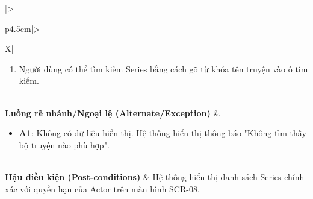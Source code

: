 \begin{table}[H]
\begin{tabularx}{\textwidth}{|>{\raggedright\arraybackslash\bfseries}p{4.5cm}|>{\raggedright\arraybackslash}X|}
\begin{minipage}[t]{\linewidth}
\begin{enumerate}[leftmargin=*]
        \item Người dùng có thể tìm kiếm Series bằng cách gõ từ khóa tên truyện vào ô tìm kiếm.
    \end{enumerate}
\end{minipage} \\ \hline
\textbf{Luồng rẽ nhánh/Ngoại lệ (Alternate/Exception)} & 
\begin{minipage}[t]{\linewidth}
    \begin{itemize}[leftmargin=*]
        \item \textbf{A1}: Không có dữ liệu hiển thị. Hệ thống hiển thị thông báo "Không tìm thấy bộ truyện nào phù hợp".
    \end{itemize}
\end{minipage} \\ \hline
\textbf{Hậu điều kiện (Post-conditions)} & Hệ thống hiển thị danh sách Series chính xác với quyền hạn của Actor trên màn hình SCR-08. \\ \hline
\end{tabularx}
\caption{Đặc tả UC-08: Xem danh sách Series}
\label{tab:uc08}
\end{table}

